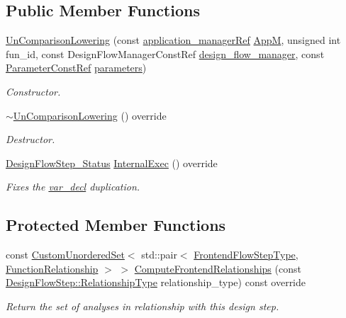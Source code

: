 \subsection*{Public Member Functions}
\begin{DoxyCompactItemize}
\item 
\hyperlink{classUnComparisonLowering_a9acaac4cf21d09d2f66d6e31c94d129c}{Un\+Comparison\+Lowering} (const \hyperlink{application__manager_8hpp_a04ccad4e5ee401e8934306672082c180}{application\+\_\+manager\+Ref} \hyperlink{classFrontendFlowStep_a0ac0d8db2a378416583f51c4faa59d15}{AppM}, unsigned int fun\+\_\+id, const Design\+Flow\+Manager\+Const\+Ref \hyperlink{classDesignFlowStep_ab770677ddf087613add30024e16a5554}{design\+\_\+flow\+\_\+manager}, const \hyperlink{Parameter_8hpp_a37841774a6fcb479b597fdf8955eb4ea}{Parameter\+Const\+Ref} \hyperlink{classDesignFlowStep_a802eaafe8013df706370679d1a436949}{parameters})
\begin{DoxyCompactList}\small\item\em Constructor. \end{DoxyCompactList}\item 
\hyperlink{classUnComparisonLowering_a656e59fbe96fd58c9e7f2dbd7c9852fa}{$\sim$\+Un\+Comparison\+Lowering} () override
\begin{DoxyCompactList}\small\item\em Destructor. \end{DoxyCompactList}\item 
\hyperlink{design__flow__step_8hpp_afb1f0d73069c26076b8d31dbc8ebecdf}{Design\+Flow\+Step\+\_\+\+Status} \hyperlink{classUnComparisonLowering_ac4701f059a92948a4b7a5157b53a36df}{Internal\+Exec} () override
\begin{DoxyCompactList}\small\item\em Fixes the \hyperlink{structvar__decl}{var\+\_\+decl} duplication. \end{DoxyCompactList}\end{DoxyCompactItemize}
\subsection*{Protected Member Functions}
\begin{DoxyCompactItemize}
\item 
const \hyperlink{classCustomUnorderedSet}{Custom\+Unordered\+Set}$<$ std\+::pair$<$ \hyperlink{frontend__flow__step_8hpp_afeb3716c693d2b2e4ed3e6d04c3b63bb}{Frontend\+Flow\+Step\+Type}, \hyperlink{classFrontendFlowStep_af7cf30f2023e5b99e637dc2058289ab0}{Function\+Relationship} $>$ $>$ \hyperlink{classUnComparisonLowering_ad1d8d14acb85fe2a1e12ccfff206af8e}{Compute\+Frontend\+Relationships} (const \hyperlink{classDesignFlowStep_a723a3baf19ff2ceb77bc13e099d0b1b7}{Design\+Flow\+Step\+::\+Relationship\+Type} relationship\+\_\+type) const override
\begin{DoxyCompactList}\small\item\em Return the set of analyses in relationship with this design step. \end{DoxyCompactList}\end{DoxyCompactItemize}
